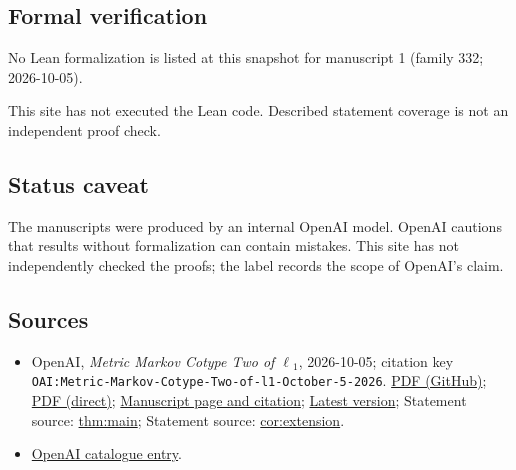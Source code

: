 \documentclass[11pt]{article}
\begin{document}
\subsection{Formal verification}
No Lean formalization is listed at this snapshot for manuscript 1 (family 332; 2026-10-05).

This site has not executed the Lean code. Described statement coverage is not an independent proof check.

\subsection{Status caveat}
The manuscripts were produced by an internal OpenAI model. OpenAI cautions that results without formalization can contain mistakes. This site has not independently checked the proofs; the label records the scope of OpenAI's claim.

\subsection{Sources}
\begin{itemize}
\item OpenAI, \emph{Metric Markov Cotype Two of \(\ell\)\({}_{1}\)}, 2026-10-05; citation key \texttt{OAI:Metric-Markov-Cotype-Two-of-l1-October-5-2026}. \href{https://github.com/openai/math/blob/adc7f1241b42e322a6451854ab7e4b4c146bf78a/preprints/Metric-Markov-Cotype-Two-of-l1-October-5-2026/l1-markov-cotype.pdf}{PDF (GitHub)}; \href{https://github.com/openai/math/raw/adc7f1241b42e322a6451854ab7e4b4c146bf78a/preprints/Metric-Markov-Cotype-Two-of-l1-October-5-2026/l1-markov-cotype.pdf}{PDF (direct)}; \href{https://github.com/openai/math/blob/adc7f1241b42e322a6451854ab7e4b4c146bf78a/preprints/Metric-Markov-Cotype-Two-of-l1-October-5-2026/README.md}{Manuscript page and citation}; \href{https://github.com/openai/math/blob/main/preprints/Metric-Markov-Cotype-Two-of-l1-October-5-2026/l1-markov-cotype.pdf}{Latest version}; Statement source: \href{https://github.com/openai/math/blob/adc7f1241b42e322a6451854ab7e4b4c146bf78a/preprints/Metric-Markov-Cotype-Two-of-l1-October-5-2026/build/main.tex\#L88}{thm:main}; Statement source: \href{https://github.com/openai/math/blob/adc7f1241b42e322a6451854ab7e4b4c146bf78a/preprints/Metric-Markov-Cotype-Two-of-l1-October-5-2026/build/main.tex\#L627}{cor:extension}.
\item \href{https://github.com/openai/math/blob/adc7f1241b42e322a6451854ab7e4b4c146bf78a/CONTENTS.md}{OpenAI catalogue entry}.
\end{itemize}
\end{document}
